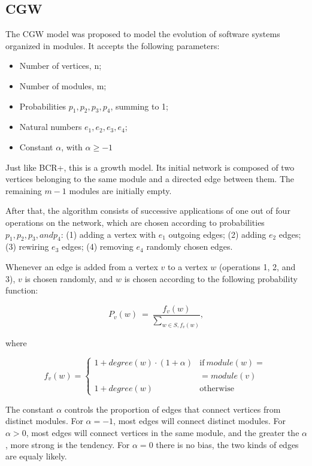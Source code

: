 \subsection{CGW}

The CGW model \cite{Chen2008} was proposed to model the evolution of software
systems organized in modules. It accepts the following parameters:

\begin{itemize}
\item Number of vertices, n;
\item Number of modules, m;
\item Probabilities $p_1, p_2, p_3, p_4$, summing to 1;
\item Natural numbers $e_1, e_2, e_3, e_4$;
\item Constant $\alpha$, with $\alpha \ge -1$
\end{itemize}

Just like BCR+, this is a growth model. Its initial network is composed of two
vertices belonging to the same module and a directed edge between them. The
remaining $m - 1$ modules are initially empty. 

After that, the algorithm consists of successive applications of one out of four
operations on the network, which are chosen according to probabilities $p_1, p_2,
p_3, and p_4$: 
(1) adding a vertex with $e_1$ outgoing edges; 
(2) adding $e_2$ edges;
(3) rewiring $e_3$ edges;
(4) removing $e_4$ randomly chosen edges.

Whenever an edge is added from a vertex $v$ to a vertex $w$ (operations 1, 2,
and 3), $v$ is chosen randomly, and $w$ is chosen according to the following
probability function:

$$
  P_v(w) ~=~ \frac{ f_v(w) }{ \displaystyle\sum_{w \in S, f_v(w)} },
$$

where

$$
f_v(w) = \left\{
\begin{array}{ll}

1 + degree(w) \cdot (1 + \alpha) &  \mathrm{if}\ module(w) = \\%
                                 &  = module(v) \\
1 + degree(w) & \mathrm{otherwise}
\end{array}
\right.
$$

The constant $\alpha$ controls the proportion of edges that connect vertices
from distinct modules. For $\alpha = -1$, most edges will connect distinct
modules. For $\alpha > 0$, most edges will connect vertices in the same module,
and the greater the $\alpha$, more strong is the tendency. For $\alpha = 0$
there is no bias, the two kinds of edges are equaly likely.

